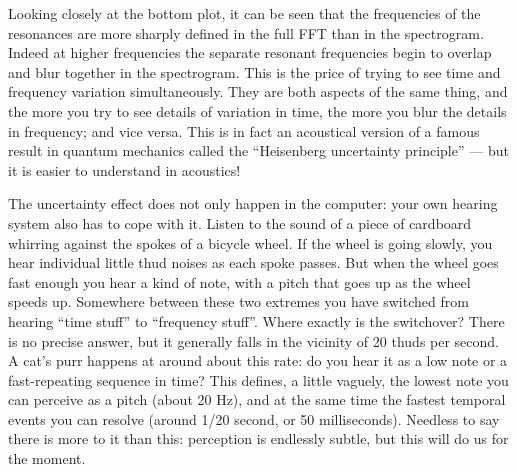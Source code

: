 
\audio{}

  Looking closely at the bottom plot, it can be seen that the frequencies of 
  the resonances are more sharply defined in the full FFT than in the 
  spectrogram. Indeed at higher frequencies the separate resonant frequencies 
  begin to overlap and blur together in the spectrogram. This is the price of 
  trying to see time and frequency variation simultaneously. They are both 
  aspects of the same thing, and the more you try to see details of variation 
  in time, the more you blur the details in frequency; and vice versa. This is 
  in fact an acoustical version of a famous result in quantum mechanics called 
  the ``Heisenberg uncertainty principle'' --- but it is easier to understand 
  in acoustics! 

  The uncertainty effect does not only happen in the computer: your own hearing 
  system also has to cope with it. Listen to the sound of a piece of cardboard 
  whirring against the spokes of a bicycle wheel. If the wheel is going slowly, 
  you hear individual little thud noises as each spoke passes. But when the 
  wheel goes fast enough you hear a kind of note, with a pitch that goes up as 
  the wheel speeds up. Somewhere between these two extremes you have switched 
  from hearing ``time stuff'' to ``frequency stuff''. Where exactly is the 
  switchover? There is no precise answer, but it generally falls in the 
  vicinity of 20 thuds per second. A cat's purr happens at around about this 
  rate: do you hear it as a low note or a fast-repeating sequence in time? This 
  defines, a little vaguely, the lowest note you can perceive as a pitch (about 
  20 Hz), and at the same time the fastest temporal events you can resolve 
  (around 1/20 second, or 50 milliseconds). Needless to say there is more to it 
  than this: perception is endlessly subtle, but this will do us for the 
  moment. 

